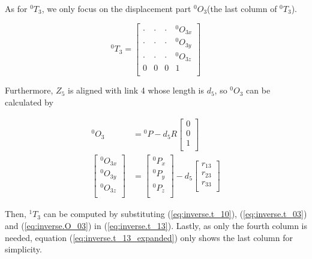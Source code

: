 \documentclass{article}
\newcommand{\T}[2]{{}^{#1}T_{#2}}
\renewcommand{\O}[2]{{}^{#1}O_{#2}}
\begin{document}
As for  $\T{0}{3}$, we only focus on the displacement part $\O{0}{3}$(the last column of $\T{0}{3}$).

\begin{equation}
\label{eq:inverse.t_03}
\T{0}{3} = \left[ \begin{array}{cccc}
	\cdot & \cdot & \cdot & {}^0O_{3x} \\
	\cdot & \cdot & \cdot & {}^0O_{3y} \\
	\cdot & \cdot & \cdot & {}^0O_{3z} \\
	0 & 0 & 0 & 1 \\
\end{array} \right]
\end{equation}

Furthermore, $Z_5$ is aligned with link 4 whose length is $d_5$, so $\O{0}{3}$ can be calculated by

\begin{equation}
\label{eq:inverse.O_03}
\begin{aligned}
\O{0}{3} & = {}^0P - d_5 R\left[
\begin{array}{c}
	0 \\
	0 \\
	1 \\
\end{array} \right]  \\
\left[
\begin{array}{c}
	{}^0O_{3x} \\
	{}^0O_{3y} \\
	{}^0O_{3z} \\
\end{array} \right] & = \left[
\begin{array}{c}
	{}^0P_x \\
	{}^0P_y \\
	{}^0P_z \\
\end{array}
\right] - d_5 \left[ \begin{array}{c}
	{}r_{13} \\
	{}r_{23} \\
	{}r_{33} \\
\end{array} \right]
\end{aligned}
\end{equation}

Then, $\T{1}{3}$ can be computed by substituting (\ref{eq:inverse.t_10}), (\ref{eq:inverse.t_03}) and (\ref{eq:inverse.O_03}) in (\ref{eq:inverse.t_13}). Lastly, as only the fourth column is needed, equation (\ref{eq:inverse.t_13_expanded}) only shows the last column for simplicity.
\end{document}
